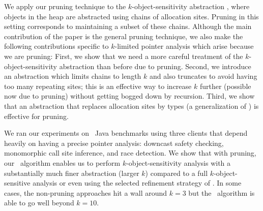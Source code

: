 
We apply our pruning technique to the $k$-object-sensitivity abstraction
\cite{kobj}, where objects in the heap are abstracted using chains of
allocation sites.  Pruning in this setting corresponds to maintaining a subset
of these chains.  Although the main contribution of the paper is the general
pruning technique, we also make the following contributions specific to
$k$-limited pointer analysis which arise because we are pruning: First, we show
that we need a more careful treatment of the $k$-object-sensitivity abstraction
than before due to pruning.  Second, we introduce an abstraction which limits
chains to length $k$ and also truncates to avoid having too many repeating
sites; this is an effective way to increase $k$ further (possible now due to
pruning) without getting bogged down by recursion.  Third, we show that an
abstraction that replaces allocation sites by types (a generalization of
\cite{smaragdakis11context}) is effective for pruning.

We ran our experiments on \numBenchmarks\ Java benchmarks using three clients that
depend heavily on having a precise pointer analysis: downcast safety
checking, monomorphic call site inference, and race detection.
We show that with pruning, our \PR\ algorithm enables us to perform $k$-object-sensitivity
analysis with a substantially much finer abstraction (larger $k$)
compared to a full $k$-object-sensitive analysis or even using the selected
refinement strategy of \cite{liang11minimal}.
In some cases, the non-pruning approaches hit a wall around $k=3$ but the \PR\
algorithm is able to go well beyond $k=10$.
